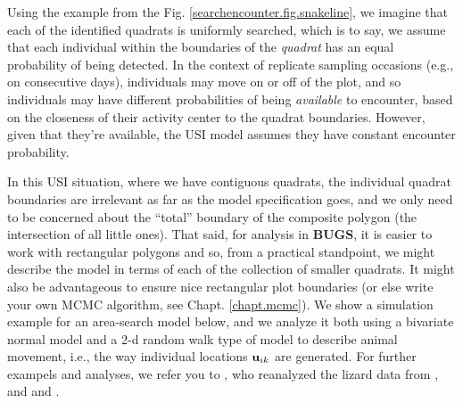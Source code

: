 Using the example from the Fig. \ref{searchencounter.fig.snakeline},
we imagine that each of the identified quadrats is uniformly searched,
which is to say, we assume that 
 each individual within the boundaries of the {\it quadrat}
has an equal probability of being detected.  In the context of
replicate sampling occasions (e.g., on consecutive days), individuals
may move on or off of the plot, and so individuals may have different
probabilities of being {\it available} to encounter, based on the
closeness of their activity center to the quadrat boundaries. However, given
that they're available, the USI model assumes they have constant
encounter probability. 
% 
%

In this USI situation, where we have contiguous quadrats,  the
individual quadrat boundaries are irrelevant as far as the model
specification goes,  and we
only need to be concerned about the ``total'' boundary of the
composite polygon (the intersection of all little ones). That said,
for analysis in {\bf BUGS}, it is easier to work with rectangular
polygons and so, from a practical standpoint, we might describe the
model in terms of each of the collection of smaller quadrats. It might also be advantageous
to ensure nice rectangular plot boundaries (or else write your own
MCMC algorithm, see Chapt. \ref{chapt.mcmc}).  We show a simulation
example for an area-search model below, and we analyze it both using a
bivariate normal model and a 2-d random walk type of model to describe
animal movement, i.e., the way individual locations ${\bf u}_{ik}$ are
generated. For further exampels and analyses, we refer you to
\citet{royle_dorazio:2008}, who reanalyzed the lizard data from
\citet{royle_young:2008}, and \citet{efford:2011ecol} and
\citet{marques_etal:2011}.

